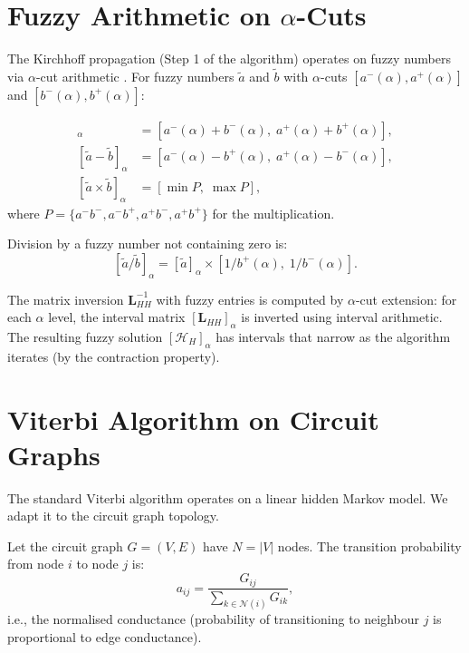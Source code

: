 \documentclass[twocolumn,10pt,a4paper]{article}
\theoremstyle{definition}
\theoremstyle{remark}
\newcommand{\Hcal}{\mathcal{H}}
\newcommand{\vect}[1]{\boldsymbol{#1}}
\newcommand{\mat}[1]{\mathbf{#1}}
\newcommand{\fuzzy}[1]{\widetilde{#1}}
\begin{document}
\section{Fuzzy Arithmetic on $\alpha$-Cuts}\label{app:fuzzy}

The Kirchhoff propagation (Step 1 of the algorithm) operates on fuzzy numbers via $\alpha$-cut arithmetic \citep{Zadeh1965, Klir1995}. For fuzzy numbers $\fuzzy{a}$ and $\fuzzy{b}$ with $\alpha$-cuts $[a^-(\alpha), a^+(\alpha)]$ and $[b^-(\alpha), b^+(\alpha)]$:

\begin{align}
    [\fuzzy{a} + \fuzzy{b}]_\alpha &= [a^-(\alpha) + b^-(\alpha), \; a^+(\alpha) + b^+(\alpha)], \label{eq:fuzzy_add} \\
    [\fuzzy{a} - \fuzzy{b}]_\alpha &= [a^-(\alpha) - b^+(\alpha), \; a^+(\alpha) - b^-(\alpha)], \label{eq:fuzzy_sub} \\
    [\fuzzy{a} \times \fuzzy{b}]_\alpha &= [\min P, \; \max P], \label{eq:fuzzy_mul}
\end{align}
where $P = \{a^-b^-, a^-b^+, a^+b^-, a^+b^+\}$ for the multiplication.

Division by a fuzzy number not containing zero is:
\begin{equation}\label{eq:fuzzy_div}
    [\fuzzy{a} / \fuzzy{b}]_\alpha = [\fuzzy{a}]_\alpha \times [1/b^+(\alpha), \; 1/b^-(\alpha)].
\end{equation}

The matrix inversion $\mat{L}_{HH}^{-1}$ with fuzzy entries is computed by $\alpha$-cut extension: for each $\alpha$ level, the interval matrix $[\mat{L}_{HH}]_\alpha$ is inverted using interval arithmetic. The resulting fuzzy solution $[\vect{\Hcal}_H]_\alpha$ has intervals that narrow as the algorithm iterates (by the contraction property).


\section{Viterbi Algorithm on Circuit Graphs}\label{app:viterbi}

The standard Viterbi algorithm \citep{Viterbi1967} operates on a linear hidden Markov model. We adapt it to the circuit graph topology.

Let the circuit graph $G = (V, E)$ have $N = |V|$ nodes. The transition probability from node $i$ to node $j$ is:
\begin{equation}\label{eq:transition}
    a_{ij} = \frac{G_{ij}}{\sum_{k \in \mathcal{N}(i)} G_{ik}},
\end{equation}
i.e., the normalised conductance (probability of transitioning to neighbour $j$ is proportional to edge conductance).
\end{document}
